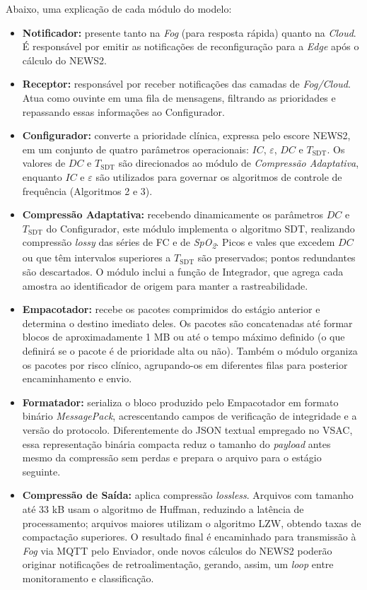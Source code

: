 \documentclass[twoside,english,brazilian]{UNISINOSmonografia}
\begin{document}
Abaixo, uma explicação de cada módulo do modelo:
\begin{itemize}
\item \textbf{Notificador:} presente tanto na \textit{Fog} (para resposta rápida) quanto na \textit{Cloud}. É responsável por emitir as notificações de reconfiguração para a \textit{Edge} após o cálculo do NEWS2.
\item \textbf{Receptor:} responsável por receber notificações das camadas de \textit{Fog/Cloud}. Atua como ouvinte em uma fila de mensagens, filtrando as prioridades e repassando essas informações ao Configurador.
\item \textbf{Configurador:} converte a prioridade clínica, expressa pelo escore NEWS2, em um conjunto de quatro parâmetros operacionais: $IC$, $\varepsilon$, $DC$ e $T_{\text{SDT}}$. Os valores de $DC$ e $T_{\text{SDT}}$ são direcionados ao módulo de \textit{Compressão Adaptativa}, enquanto $IC$ e $\varepsilon$ são utilizados para governar os algoritmos de controle de frequência (Algoritmos 2 e 3).
\item \textbf{Compressão Adaptativa:} recebendo dinamicamente os parâmetros $DC$ e $T_{\text{SDT}}$ do Configurador, este módulo implementa o algoritmo SDT, realizando compressão \textit{lossy} das séries de FC e de \textit{SpO\textsubscript{2}}. Picos e vales que excedem $DC$ ou que têm intervalos superiores a $T_{\text{SDT}}$ são preservados; pontos redundantes são descartados. O módulo inclui a função de Integrador, que agrega cada amostra ao identificador de origem para manter a rastreabilidade.
\item \textbf{Empacotador:} recebe os pacotes comprimidos do estágio anterior e determina o destino imediato deles. Os pacotes são concatenadas até formar blocos de aproximadamente 1 MB ou até o tempo máximo definido (o que definirá se o pacote é de prioridade alta ou não). Também o módulo organiza os pacotes por risco clínico, agrupando-os em diferentes filas para posterior encaminhamento e envio.
\item \textbf{Formatador:} serializa o bloco produzido pelo Empacotador em formato binário \textit{MessagePack}, acrescentando campos de verificação de integridade e a versão do protocolo. Diferentemente do JSON textual empregado no VSAC, essa representação binária compacta reduz o tamanho do \textit{payload} antes mesmo da compressão sem perdas e prepara o arquivo para o estágio seguinte.
\item \textbf{Compressão de Saída:} aplica compressão \textit{lossless}. Arquivos com tamanho até 33 kB usam o algoritmo de Huffman, reduzindo a latência de processamento; arquivos maiores utilizam o algoritmo LZW, obtendo taxas de compactação superiores. O resultado final é encaminhado para transmissão à \textit{Fog} via MQTT pelo Enviador, onde novos cálculos do NEWS2 poderão originar notificações de retroalimentação, gerando, assim, um \textit{loop} entre monitoramento e classificação.
\end{itemize}
\end{document}
